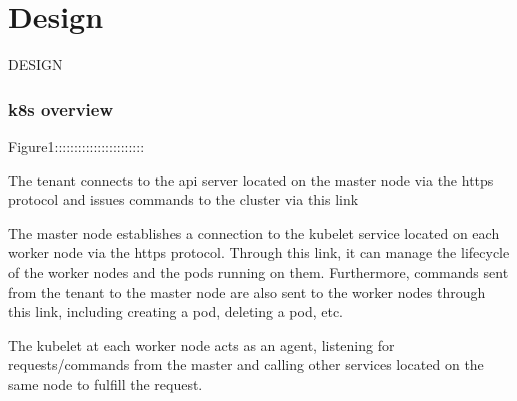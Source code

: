 \chapter{Design}
\label{sec:design}





DESIGN





\subsection{k8s overview}

    Figure1:::::::::::::::::::::::

    The tenant connects to the api server located on the master node via the https protocol and issues commands to the cluster via this link
    
    The master node establishes a connection to the kubelet service located on each worker node via the https protocol. Through this link, it can manage the lifecycle of the worker nodes and the pods running on them. Furthermore, commands sent from the tenant to the master node 
    are also sent to the worker nodes through this link, including creating a pod, deleting a pod, etc.
    
    The kubelet at each worker node acts as an agent, listening for requests/commands from the master and calling other services located on the same node to fulfill the request.
    
